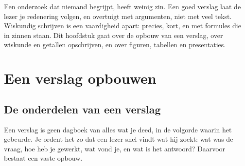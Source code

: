 %



Een onderzoek dat niemand begrijpt, heeft weinig zin. Een goed verslag laat de lezer je redenering volgen, en overtuigt met argumenten, niet met veel tekst. Wiskundig schrijven is een vaardigheid apart: precies, kort, en met formules die in zinnen staan. Dit hoofdstuk gaat over de opbouw van een verslag, over wiskunde en getallen opschrijven, en over figuren, tabellen en presentaties.

\begin{oefeningen}[Start]

\end{oefeningen}

\section{Een verslag opbouwen}

\subsection{De onderdelen van een verslag}

Een verslag is geen dagboek van alles wat je deed, in de volgorde waarin het gebeurde. Je ordent het zo dat een lezer snel vindt wat hij zoekt: wat was de vraag, hoe heb je gewerkt, wat vond je, en wat is het antwoord? Daarvoor bestaat een vaste opbouw.

